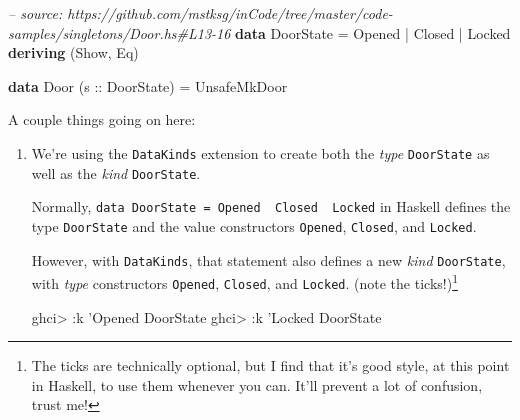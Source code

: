 \documentclass[]{article}
\newenvironment{Shaded}{}{}
\newcommand{\KeywordTok}[1]{\textcolor[rgb]{0.00,0.44,0.13}{\textbf{#1}}}
\newcommand{\DataTypeTok}[1]{\textcolor[rgb]{0.56,0.13,0.00}{#1}}
\newcommand{\CharTok}[1]{\textcolor[rgb]{0.25,0.44,0.63}{#1}}
\newcommand{\CommentTok}[1]{\textcolor[rgb]{0.38,0.63,0.69}{\textit{#1}}}
\newcommand{\OtherTok}[1]{\textcolor[rgb]{0.00,0.44,0.13}{#1}}
\newcommand{\FunctionTok}[1]{\textcolor[rgb]{0.02,0.16,0.49}{#1}}
\newcommand{\NormalTok}[1]{#1}
\begin{document}
\begin{Shaded}
\begin{Highlighting}[]
\CommentTok{-- source: https://github.com/mstksg/inCode/tree/master/code-samples/singletons/Door.hs#L13-16}
\KeywordTok{data} \DataTypeTok{DoorState} \FunctionTok{=} \DataTypeTok{Opened} \FunctionTok{|} \DataTypeTok{Closed} \FunctionTok{|} \DataTypeTok{Locked}
  \KeywordTok{deriving}\NormalTok{ (}\DataTypeTok{Show}\NormalTok{, }\DataTypeTok{Eq}\NormalTok{)}

\KeywordTok{data} \DataTypeTok{Door}\NormalTok{ (}\OtherTok{s ::} \DataTypeTok{DoorState}\NormalTok{) }\FunctionTok{=} \DataTypeTok{UnsafeMkDoor}
\end{Highlighting}
\end{Shaded}

A couple things going on here:

\begin{enumerate}
\def\labelenumi{\arabic{enumi}.}
\item
  We're using the \texttt{DataKinds} extension to create both the \emph{type}
  \texttt{DoorState} as well as the \emph{kind} \texttt{DoorState}.

  Normally,
  \texttt{data\ DoorState\ =\ Opened\ \textbar{}\ Closed\ \textbar{}\ Locked} in
  Haskell defines the type \texttt{DoorState} and the value constructors
  \texttt{Opened}, \texttt{Closed}, and \texttt{Locked}.

  However, with \texttt{DataKinds}, that statement also defines a new
  \emph{kind} \texttt{DoorState}, with \emph{type} constructors
  \texttt{\textquotesingle{}Opened}, \texttt{\textquotesingle{}Closed}, and
  \texttt{\textquotesingle{}Locked}. (note the \texttt{\textquotesingle{}}
  ticks!)\footnote{The \texttt{\textquotesingle{}} ticks are technically
    optional, but I find that it's good style, at this point in Haskell, to use
    them whenever you can. It'll prevent a lot of confusion, trust me!}

\begin{Shaded}
\begin{Highlighting}[]
\NormalTok{ghci}\FunctionTok{>} \FunctionTok{:}\NormalTok{k }\CharTok{'Opened}
\DataTypeTok{DoorState}
\NormalTok{ghci}\FunctionTok{>} \FunctionTok{:}\NormalTok{k }\CharTok{'Locked}
\DataTypeTok{DoorState}
\end{Highlighting}
\end{Shaded}
\end{enumerate}
\end{document}
